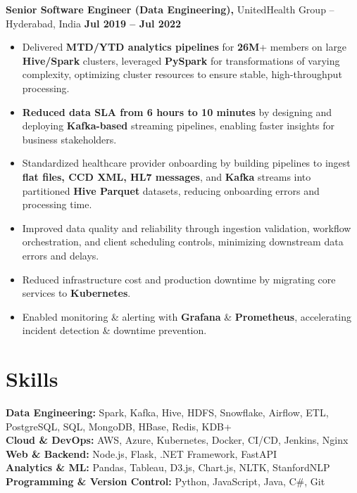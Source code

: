 \documentclass[letterpaper]{article}
\begin{document}
\textbf{Senior Software Engineer (Data Engineering),} UnitedHealth Group -- Hyderabad, India \hfill \textbf{Jul 2019 -- Jul 2022} \\
\vspace{2pt}
\begin{itemize}
  \item Delivered \textbf{MTD/YTD analytics pipelines} for \textbf{26M}+ members on large \textbf{Hive/Spark} clusters, leveraged \textbf{PySpark} for transformations of varying complexity, optimizing cluster resources to ensure stable, high-throughput processing.
  \item \textbf{Reduced data SLA from 6 hours to 10 minutes} by designing and deploying \textbf{Kafka-based} streaming pipelines, enabling faster insights for business stakeholders.
  \item Standardized healthcare provider onboarding by building pipelines to ingest \textbf{flat files, CCD XML, HL7 messages}, and \textbf{Kafka} streams into partitioned \textbf{Hive Parquet} datasets, reducing onboarding errors and processing time.
  \item Improved data quality and reliability through ingestion validation, workflow orchestration, and client scheduling controls, minimizing downstream data errors and delays.
  \item Reduced infrastructure cost and production downtime by migrating core services to \textbf{Kubernetes}.
  \item Enabled monitoring \& alerting with \textbf{Grafana} \& \textbf{Prometheus}, accelerating incident detection \& downtime prevention.
\end{itemize}

\vspace{0pt}

\section*{Skills}
\textbf{Data Engineering:} Spark, Kafka, Hive, HDFS, Snowflake, Airflow, ETL, PostgreSQL, SQL, MongoDB, HBase, Redis, KDB+ \\
\textbf{Cloud \& DevOps:} AWS, Azure, Kubernetes, Docker, CI/CD, Jenkins, Nginx \\
\textbf{Web \& Backend:} Node.js, Flask, .NET Framework, FastAPI \\
\textbf{Analytics \& ML:} Pandas, Tableau, D3.js, Chart.js, NLTK, StanfordNLP \\
\textbf{Programming \& Version Control:} Python, JavaScript, Java, C\#, Git
\end{document}
